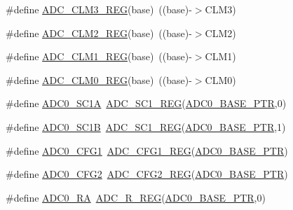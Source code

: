 \begin{DoxyCompactItemize}
\#define \hyperlink{group___a_d_c___register___accessor___macros_ga0a8093e23425c874338420fc5d597bb2}{A\+D\+C\+\_\+\+C\+L\+M3\+\_\+\+R\+EG}(base)~((base)-\/$>$C\+L\+M3)
\item 
\#define \hyperlink{group___a_d_c___register___accessor___macros_gadf744875fb3c71dbc6d0a7cde6a8b0b4}{A\+D\+C\+\_\+\+C\+L\+M2\+\_\+\+R\+EG}(base)~((base)-\/$>$C\+L\+M2)
\item 
\#define \hyperlink{group___a_d_c___register___accessor___macros_ga7b605b481843764fbe256fc588629079}{A\+D\+C\+\_\+\+C\+L\+M1\+\_\+\+R\+EG}(base)~((base)-\/$>$C\+L\+M1)
\item 
\#define \hyperlink{group___a_d_c___register___accessor___macros_ga9ee18d17721b33728716bab21e035534}{A\+D\+C\+\_\+\+C\+L\+M0\+\_\+\+R\+EG}(base)~((base)-\/$>$C\+L\+M0)
\item 
\#define \hyperlink{group___a_d_c___register___accessor___macros_ga4ec61cea717b410cadc80c71f4c81664}{A\+D\+C0\+\_\+\+S\+C1A}~\hyperlink{group___a_d_c___register___accessor___macros_ga1b28fcb3112387441ecc5fe9251a32e9}{A\+D\+C\+\_\+\+S\+C1\+\_\+\+R\+EG}(\hyperlink{group___a_d_c___peripheral_ga6cec2f227a3a37a9fccaa830740f1f5e}{A\+D\+C0\+\_\+\+B\+A\+S\+E\+\_\+\+P\+TR},0)
\item 
\#define \hyperlink{group___a_d_c___register___accessor___macros_ga9a83b6b66f4db147b1c3f952e62b57d5}{A\+D\+C0\+\_\+\+S\+C1B}~\hyperlink{group___a_d_c___register___accessor___macros_ga1b28fcb3112387441ecc5fe9251a32e9}{A\+D\+C\+\_\+\+S\+C1\+\_\+\+R\+EG}(\hyperlink{group___a_d_c___peripheral_ga6cec2f227a3a37a9fccaa830740f1f5e}{A\+D\+C0\+\_\+\+B\+A\+S\+E\+\_\+\+P\+TR},1)
\item 
\#define \hyperlink{group___a_d_c___register___accessor___macros_ga74e7b7426570c776cdb8a83a9a20c654}{A\+D\+C0\+\_\+\+C\+F\+G1}~\hyperlink{group___a_d_c___register___accessor___macros_gaa64d6563b96bb9c13693c466528decd7}{A\+D\+C\+\_\+\+C\+F\+G1\+\_\+\+R\+EG}(\hyperlink{group___a_d_c___peripheral_ga6cec2f227a3a37a9fccaa830740f1f5e}{A\+D\+C0\+\_\+\+B\+A\+S\+E\+\_\+\+P\+TR})
\item 
\#define \hyperlink{group___a_d_c___register___accessor___macros_gaf8d364b043484d65f099b0cdbe4a680c}{A\+D\+C0\+\_\+\+C\+F\+G2}~\hyperlink{group___a_d_c___register___accessor___macros_gad5bd555e9653cefc30e9fdb2834f7a57}{A\+D\+C\+\_\+\+C\+F\+G2\+\_\+\+R\+EG}(\hyperlink{group___a_d_c___peripheral_ga6cec2f227a3a37a9fccaa830740f1f5e}{A\+D\+C0\+\_\+\+B\+A\+S\+E\+\_\+\+P\+TR})
\item 
\#define \hyperlink{group___a_d_c___register___accessor___macros_ga75de47a15ded5bfdd1e17fb6a2b430d5}{A\+D\+C0\+\_\+\+RA}~\hyperlink{group___a_d_c___register___accessor___macros_gaecd126e0e0812785b36331de88019dde}{A\+D\+C\+\_\+\+R\+\_\+\+R\+EG}(\hyperlink{group___a_d_c___peripheral_ga6cec2f227a3a37a9fccaa830740f1f5e}{A\+D\+C0\+\_\+\+B\+A\+S\+E\+\_\+\+P\+TR},0)

\end{DoxyCompactItemize}
